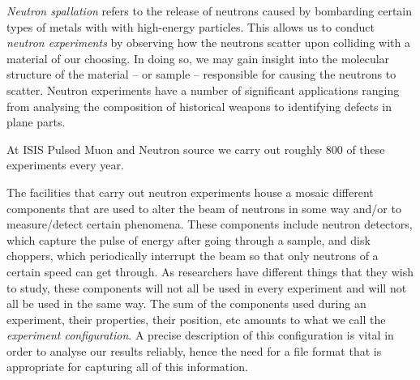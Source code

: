 \textit{Neutron spallation} refers to the release of neutrons caused by bombarding certain types of metals with with high-energy particles. This allows us to conduct \textit{neutron experiments} by observing how the neutrons scatter upon colliding with a material of our choosing. In doing so, we may gain insight into the molecular structure of the material -- or sample -- responsible for causing the neutrons to scatter. Neutron experiments have a number of significant applications ranging from analysing the composition of historical weapons to identifying defects in plane parts.

At ISIS Pulsed Muon and Neutron source we carry out roughly 800 of these experiments every year. 

The facilities that carry out neutron experiments house a mosaic different components that are used to alter the beam of neutrons in some way and/or to measure/detect certain phenomena. These components include neutron detectors, which capture the pulse of energy after going through a sample, and disk choppers, which periodically interrupt the beam so that only neutrons of a certain speed can get through. As researchers have different things that they wish to study, these components will not all be used in every experiment and will not all be used in the same way. The sum of the components used during an experiment, their properties, their position, etc amounts to what we call the \textit{experiment configuration}. A precise description of this configuration is vital in order to analyse our results reliably, hence the need for a file format that is appropriate for capturing all of this information.
